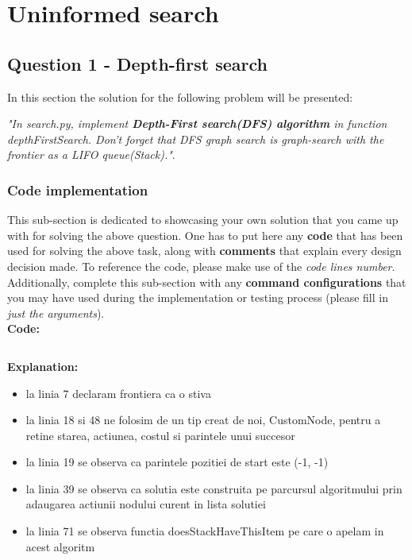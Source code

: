 \section{Uninformed search}

\subsection{Question 1 - Depth-first search}
In this section the solution for the following problem will be presented: \newline


\textit{"In search.py, implement \textbf{Depth-First search(DFS) algorithm} in  function \textit{depthFirstSearch}. Don’t  forget that DFS graph search is graph-search with the frontier as a LIFO queue(Stack)."}.


\subsubsection{Code implementation}
This sub-section is dedicated to showcasing your own solution that you came up with for solving the above question. One has to put here any \textbf{code} that has been used for solving the above task, along with \textbf{comments} that explain every design decision made. To reference the code, please make use of the \textit{code lines number}. Additionally, complete this sub-section with any \textbf{command configurations} that you may have used during the implementation or testing process (please fill in \textit{just the arguments}). \\

\textbf{Code:}
\inputminted[linenos]{python}{code/01_dfs.py}


\textbf{Explanation:}
\begin{itemize}
    \setlength\itemsep{0em}
    \item la linia 7 declaram frontiera ca o stiva
    \item la linia 18 si 48 ne folosim de un tip creat de noi, CustomNode, pentru a retine starea, actiunea, costul si parintele unui succesor
    \item la linia 19 se observa ca parintele pozitiei de start este (-1, -1)
    \item la linia 39 se observa ca solutia este construita pe parcursul algoritmului prin adaugarea actiunii nodului curent in lista solutiei
    \item la linia 71 se observa functia doesStackHaveThisItem pe care o apelam in acest algoritm

\end{itemize}


